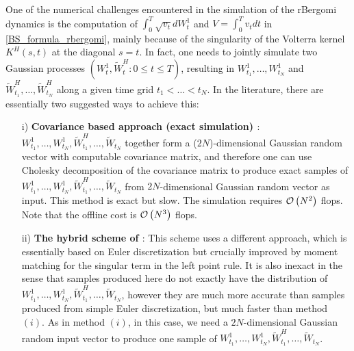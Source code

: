 One of the numerical challenges encountered in the simulation of the rBergomi dynamics  is the computation of  $\int_{0}^{T} \sqrt{v_t} dW_t^1$ and $V=\int_{0}^{T} v_t dt$ in \eqref{BS_formula_rbergomi}, mainly because of the singularity of the Volterra kernel $K^H(s,t)$ at the diagonal $s = t$. In fact,  one needs to jointly simulate two Gaussian processes $(W_t^1, \widetilde{W}^H_t: 0 \le t \le T)$, resulting in $W^1_{t_1},\dots, W^1_{t_N}$ and $\widetilde{W}^H_{t_1},\dots, \widetilde{W}^H_{t_N}$ along a given time grid $t_1 <\dots < t_N$. In the literature, there are essentially two suggested ways to achieve this:
 \begin{enumerate}
 	
 	\item[i)] \textbf{Covariance based approach (exact simulation) \cite{bayer2016pricing,bayer2018short}}: $W^1_{t_1},\dots, W^1_{t_N}, \widetilde{W}^H_{t_1},\dots, \widetilde{W}_{t_N}$ together form a ($2N$)-dimensional Gaussian random vector with computable covariance matrix, and therefore one can use Cholesky decomposition of the covariance matrix to produce exact samples of $W^1_{t_1},\dots, W^1_{t_N}, \widetilde{W}^H_{t_1},\dots, \widetilde{W}_{t_N}$ from $2 N$-dimensional Gaussian random vector as  input. This method is exact but slow. The simulation  requires ${\mathcal{O}}\left(N^2\right)$ flops. Note that the offline cost is ${\mathcal{O}}\left(N^3\right)$ flops.
 	
 	\item[ii)]  \textbf{The hybrid scheme of \cite{bennedsen2017hybrid}}: This scheme uses a different approach, which is essentially based on  Euler discretization  but crucially improved by moment
 	matching for the singular term in the left point rule. It is also
 	inexact in the sense that samples produced here do not exactly have the distribution of $W^1_{t_1},\dots, W^1_{t_N}, \widetilde{W}^H_{t_1},\dots, \widetilde{W}_{t_N}$, however they are much more accurate than samples produced from simple Euler discretization, but much faster than method $(i)$. As in method $(i)$, in this case, we need a $2 N$-dimensional Gaussian random input vector to produce one 	sample of $W^1_{t_1},\dots, W^1_{t_N}, \widetilde{W}^H_{t_1},\dots, \widetilde{W}_{t_N}$.
 \end{enumerate} 
